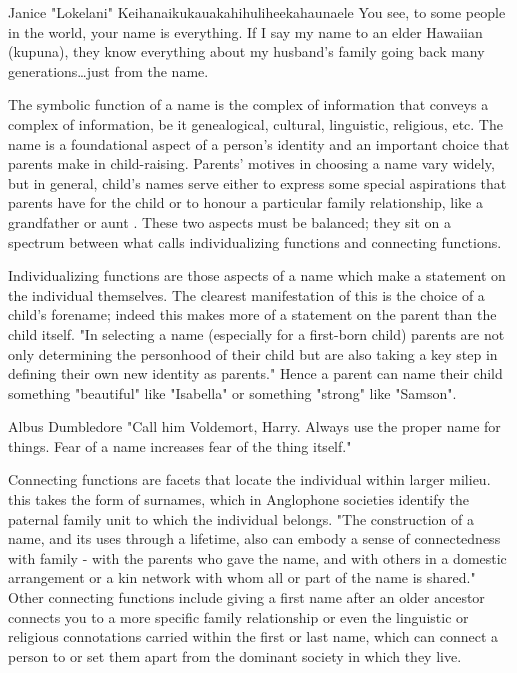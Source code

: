 \begin{aquote}{Janice "Lokelani" Keihanaikukauakahihuliheekahaunaele
	\parencite{lee-valley}}
	You see, to some people in the world, your name is everything. If I say my
	name to an elder Hawaiian (kupuna), they know everything about my husband's
	family going back many generations…just from the name.
\end{aquote}

The symbolic function of a name is the complex of information that conveys a complex of information, be it genealogical, cultural, linguistic, religious, etc. The name is a foundational aspect of a person's identity and an important choice that parents make in child-raising. Parents' motives in choosing a name vary widely, but in general, child's names serve either to express some special aspirations that parents have for the child or to honour a particular family relationship, like a grandfather or aunt \parencite{finch08}. These two aspects must be balanced; they sit on a spectrum between what \textcite{finch08} calls individualizing functions and connecting functions.

Individualizing functions are those aspects of a name which make a statement on the individual themselves. The clearest manifestation of this is the choice of a child's forename; indeed this makes more of a statement on the parent than the child itself. "In selecting a name (especially for a first-born child) parents are not only determining the personhood of their child but are also taking a key step in defining their own new identity as parents." \parencite[718]{finch08} Hence a parent can name their child something "beautiful" like "Isabella" or something "strong" like "Samson".

\begin{aquote}{Albus Dumbledore}
"Call him Voldemort, Harry. Always use the proper name for things. Fear of a
name increases fear of the thing itself." \parencite{rowling97}
\end{aquote}

Connecting functions are facets that locate the individual within larger milieu. this takes the form of surnames, which in Anglophone societies identify the paternal family unit to which the individual belongs. "The construction of a name, and its uses through a lifetime, also can embody a sense of connectedness with family - with the parents who gave the name, and with others in a domestic arrangement or a kin network with whom all or part of the name is shared." \parencite[711]{finch08} Other connecting functions include giving a first name after an older ancestor connects you to a more specific family relationship or even the linguistic or religious connotations carried within the first or last name, which can connect a person to or set them apart from the dominant society in which they live.
